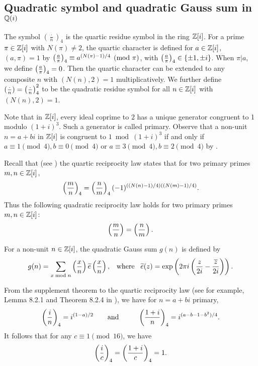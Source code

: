 \documentclass[twoside,leqno,10pt, A4]{amsart}
\begin{document}
\subsection{Quadratic symbol and quadratic Gauss sum in $\mathbb Q(i)$}
\label{sec2.4}
   The symbol $(\frac{\cdot}{n})_4$ is the quartic
residue symbol in the ring $\mathbb Z[i]$.  For a prime $\pi \in \mathbb Z[i]$
with $N(\pi) \neq 2$, the quartic character is defined for $a \in
\mathbb Z[i]$, $(a, \pi)=1$ by $\left(\frac{a}{\pi}\right)_4 \equiv
a^{(N(\pi)-1)/4} \pmod{\pi}$, with $\left(\frac{a}{\pi}\right)_4 \in \{
\pm 1, \pm i \}$. When $\pi | a$, we define
$\left(\frac{a}{\pi}\right)_4 =0$.  Then the quartic character can be extended
to any composite $n$ with $(N(n), 2)=1$ multiplicatively. We further define $(\frac{\cdot}{n})=\left(\frac{\cdot}{n}\right)^2_4$  to be the quadratic
residue symbol for all $n \in \mathbb Z[i]$ with $(N(n), 2)=1$. \newline

 Note that in $\mathbb{Z}[i]$, every ideal coprime to $2$ has a unique
generator congruent to 1 modulo $(1+i)^3$.  Such a generator is
called primary. Observe that a non-unit
$n=a+bi$ in $\mathbb Z[i]$ is congruent to $1
\bmod{(1+i)^3}$ if and only if $a \equiv 1 \pmod{4}, b \equiv
0 \pmod{4}$ or $a \equiv 3 \pmod{4}, b \equiv 2 \pmod{4}$ by \cite[Lemma 6, p. 121]{I&R}. \newline

  Recall that (see \cite[Theorem 2, p. 123]{I&R}) the quartic reciprocity law states
that for two primary primes  $m, n \in \mathbb Z[i]$,
\begin{align*}
 \left(\frac{m}{n}\right)_4 = \left(\frac{n}{m}\right)_4(-1)^{((N(n)-1)/4)((N(m)-1)/4)}.
\end{align*}
Thus the following quadratic reciprocity law holds for two primary primes  $m, n \in \mathbb Z[i]$:
\begin{align*}
 \left(\frac{m}{n}\right) = \left(\frac{n}{m}\right).
\end{align*}

 For a non-unit $n \in \mathbb Z[i]$, the quadratic Gauss sum $g(n)$ is defined by
\[    g(n) =\sum_{x \bmod{n}} \left(\frac{x}{n}\right) \widetilde{e}\left(\frac{x}{n}\right), \; \; \; \mbox{where} \; \; \; \widetilde{e}(z) =\exp \left( 2\pi i  \left( \frac {z}{2i} - \frac {\overline{z}}{2i} \right) \right). \]

     From the supplement theorem to the quartic reciprocity law (see for example, Lemma 8.2.1 and Theorem 8.2.4 in \cite{BEW}),
we have for $n=a+bi$ primary,
\begin{align*}
  \left(\frac{i}{n}\right)_4=i^{(1-a)/2} \qquad \mbox{and} \qquad  \hspace{0.1in} \left(\frac{1+i}{n}\right)_4=i^{(a-b-1-b^2)/4}.
\end{align*}
   It follows that for any $c \equiv 1 \pmod {16}$, we have
\begin{align}
\label{2.5i}
  \left(\frac{i}{c}\right)_4=\left(\frac{1+i}{c}\right)_4=1.
\end{align}
\end{document}
